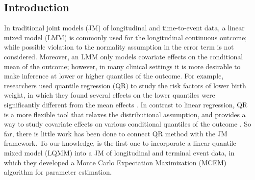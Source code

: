 





% 


\subsection{Introduction}


In traditional joint models (JM) of longitudinal and time-to-event data, a linear mixed model (LMM) \citep{laird1982random} is commonly used for the longitudinal continuous outcome; while possible violation to the normality assumption in the error term is not considered. Moreover, an LMM only models covariate effects on the conditional mean of the outcome; however, in many clinical settings it is more desirable to make inference at lower or higher quantiles of the outcome. For example, researchers used quantile regression (QR) to study the risk factors of lower birth weight, in which they found several effects on the lower quantiles were significantly different from the mean effects \citep{koenker2001quantile}. In contrast to linear regression, QR is a more flexible tool that relaxes the distributional assumption, and provides a way to study covariate effects on various conditional quantiles of the outcome \citep{koenker2005quantile}. So far, there is little work has been done to connect QR method with the JM framework. To our knowledge, \cite{farcomeni2015longitudinal} is the first one to incorporate a linear quantile mixed model (LQMM) into a JM of longitudinal and terminal event data, in which they developed a Monte Carlo Expectation Maximization (MCEM) algorithm for parameter estimation.


